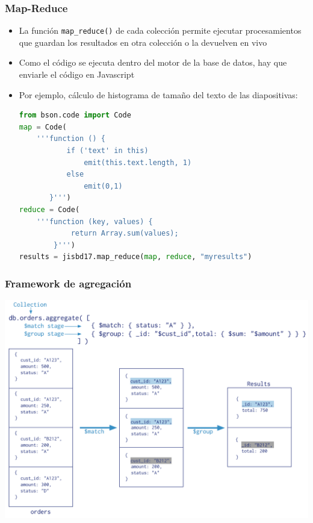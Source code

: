 \documentclass[14pt]{beamer}
\begin{document}
\begin{frame}
  \frametitle{Map-Reduce}
  \begin{itemize}
  \item La función {\tt map\_reduce()} de cada colección permite ejecutar
    procesamientos que guardan los resultados en otra colección o la
    devuelven en vivo
  \item Como el código se ejecuta dentro del motor de la base de datos, hay
    que enviarle el código en Javascript
  \item Por ejemplo, cálculo de histograma de tamaño del texto de las
    diapositivas:
\framebreak
\begin{lstlisting}[language=Python]
from bson.code import Code
map = Code(
    '''function () {
           if ('text' in this)
               emit(this.text.length, 1)
           else
               emit(0,1)
       }''')
reduce = Code(
    '''function (key, values) {
            return Array.sum(values);
        }''')
results = jisbd17.map_reduce(map, reduce, "myresults")
\end{lstlisting}

  \end{itemize}
\end{frame}


\begin{frame}
  \frametitle{Framework de agregación}
  \centering\includegraphics[height=.85\textheight]{img/mongo-aggregation}
\end{frame}
\end{document}
